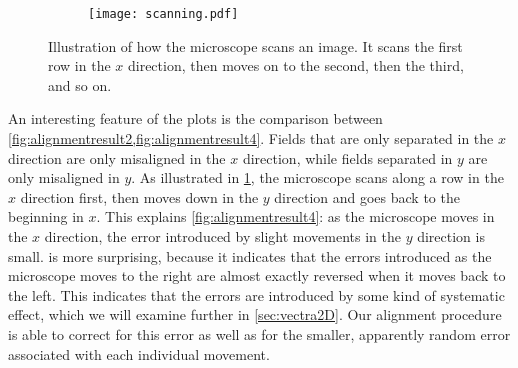 \documentclass{article}
\begin{document}
\begin{figure}[ht]
	\centering
	\begin{subfigure}{0.45\linewidth}
		\texttt{[image: scanning.pdf]}
	\end{subfigure}
	\caption{Illustration of how the microscope scans an image.  It scans the first row in the $x$ direction, then moves on to the second, then the third, and so on.}
	\label{fig:scanning}
\end{figure}

An interesting feature of the plots is the comparison between \cref{fig:alignmentresult2,fig:alignmentresult4}.  Fields that are only separated in the $x$ direction are only misaligned in the $x$ direction, while fields separated in $y$ are only misaligned in $y$.  As illustrated in \cref{fig:scanning}, the microscope scans along a row in the $x$ direction first, then moves down in the $y$ direction and goes back to the beginning in $x$.  This explains \cref{fig:alignmentresult4}: as the microscope moves in the $x$ direction, the error introduced by slight movements in the $y$ direction is small.   is more surprising, because it indicates that the errors introduced as the microscope moves to the right are almost exactly reversed when it moves back to the left.  This indicates that the errors are introduced by some kind of systematic effect, which we will examine further in \cref{sec:vectra2D}.  Our alignment procedure is able to correct for this error as well as for the smaller, apparently random error associated with each individual movement.
\end{document}
